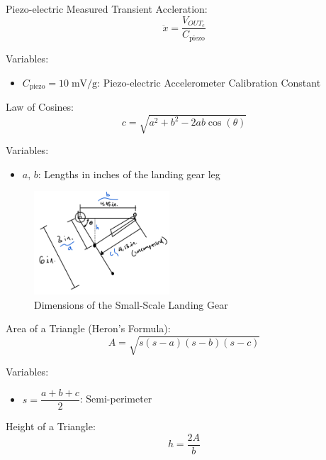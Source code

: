 \documentclass{article}
\begin{document}
Piezo-electric Measured Transient Accleration:
\begin{equation}
    \ddot{x} = \dfrac{V_{OUT_c}}{C_{\text{piezo}}}
\end{equation}

Variables:
\begin{itemize}
    \item \(C_{\text{piezo}} = 10\; \text{mV/g}\): Piezo-electric Accelerometer Calibration Constant
\end{itemize}
\vspace{5mm}

Law of Cosines:
\begin{equation}
    c = \sqrt{a^{2} + b^{2} - 2ab\cos{(\theta)}}
\end{equation}

Variables:
\begin{itemize}
    \item \(a,\, b\): Lengths in inches of the landing gear leg
\end{itemize}

\begin{figure}[H]
    \centering
    \includegraphics[width = 0.45\textwidth]{lab8images/landinggeardimensions.png}
    \caption{Dimensions of the Small-Scale Landing Gear}
    \label{fig:geardimensions}
\end{figure}
\vspace{5mm}

Area of a Triangle (Heron's Formula):
\begin{equation}
    A = \sqrt{s(s-a)(s-b)(s-c)}
\end{equation}

Variables:
\begin{itemize}
    \item \(s = \dfrac{a+b+c}{2}\): Semi-perimeter
\end{itemize}
\vspace{5mm}

Height of a Triangle:
\begin{equation}
    h = \dfrac{2A}{b}
\end{equation}
\end{document}
